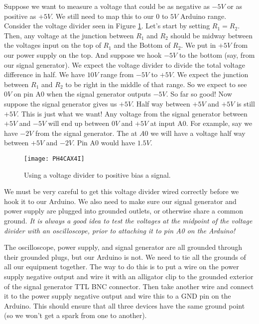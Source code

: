 Suppose we want to measure a voltage that could be as negative as $-5\unit{V}
$ or as positive as $+5\unit{V}.$ We still need to map this to our $0$ to $5%
\unit{V}$ Arduino range. Consider the voltage divider seen in Figure
\ref{fig:rlc_vd}.
Let's start by setting $R_{1}=R_{2}.$ Then, any voltage at the junction
between $R_{1}$ and $R_{2}$ should be midway between the voltages input on
the top of $R_{1}$ and the Bottom of $R_{2}.$ We put in $+5\unit{V}$ from
our power supply on the top. And suppose we hook $-5\unit{V}$ to the bottom
(say, from our signal generator). We expect the voltage divider to divide
the total voltage difference in half. We have $10\unit{V}$ range from $-5%
\unit{V}$ to $+5\unit{V}$. We expect the junction between $R_{1}$ and $R_{2}$
to be right in the middle of that range. So we expect to see $0\unit{V}$ on
pin A0 when the signal generator outputs $-5\unit{V}.$ So far so good! Now
suppose the signal generator gives us $+5\unit{V}.$ Half way between $+5%
\unit{V}$ and $+5\unit{V}$ is still $+5\unit{V}$. This is just what we want!
Any voltage from the signal generator between $+5\unit{V}$ and $-5\unit{V}$
will end up between $0\unit{V}$ and $+5\unit{V}$ at input A0. For example,
say we have $-2\unit{V}$ from the signal generator. The at $A0$ we will have
a voltage half way between $+5\unit{V}$ and $-2\unit{V}.$ Pin A0 would have $%
1.5\unit{V}.$
\begin{figure}[tbp!]
\centering
\texttt{[image: PH4CAX4I]}
	\caption{Using a voltage divider to positive bias a signal.}
	\label{fig:rlc_vd}
\end{figure}


We must be very careful to get this
voltage divider wired correctly before we hook it to our
Arduino. We also need to make sure our signal generator and power supply are
plugged into grounded outlets, or otherwise share a common ground. 
\emph{It is always a good idea to test the voltages at the midpoint of the
voltage divider with an
oscilloscope, prior to attaching it to pin A0 on the Arduino!}

The oscilloscope, power supply, and signal generator are all grounded
through their grounded plugs, but our Arduino is not. We need to tie all the
grounds of all our equipment together. The way to do this is to 
put a wire on the power supply
negative output and wire it with an alligator clip to the grounded exterior
of the signal generator TTL BNC connector. Then take another wire and
connect it to the power supply negative output and wire this to a GND pin
on the Arduino. This should ensure that all three devices have the same
ground point (so we won't get a spark from one to another).

